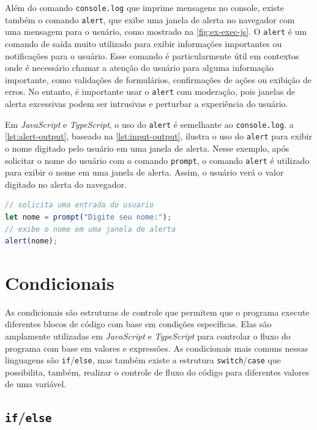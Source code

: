 Além do comando \texttt{console.log} que imprime mensagens no console, existe também o comando \texttt{alert}, que exibe uma janela de alerta no navegador com uma mensagem para o usuário, como mostrado na \autoref{fig:ex-exec-js}. O \texttt{alert} é um comando de saída muito utilizado para exibir informações importantes ou notificações para o usuário. Esse comando é particularmente útil em contextos onde é necessário chamar a atenção do usuário para alguma informação importante, como validações de formulários, confirmações de ações ou exibição de erros. No entanto, é importante usar o \texttt{alert} com moderação, pois janelas de alerta excessivas podem ser intrusivas e perturbar a experiência do usuário.

Em \textit{JavaScript} e \textit{TypeScript}, o uso do \texttt{alert} é semelhante ao \texttt{console.log}. a \autoref{lst:alert-output}, baseado na \autoref{lst:input-output}, ilustra o uso do \texttt{alert} para exibir o nome digitado pelo usuário em uma janela de alerta. Nesse exemplo, após solicitar o nome do usuário com o comando \texttt{prompt}, o comando \texttt{alert} é utilizado para exibir o nome em uma janela de alerta. Assim, o usuário verá o valor digitado no alerta do navegador.

\begin{lstlisting}[language=TypeScript, caption=Exemplo de Utilização do Comando Alert em JS e TS., label=lst:alert-output]
// solicita uma entrada do usuario
let nome = prompt("Digite seu nome:");
// exibe o nome em uma janela de alerta
alert(nome);
\end{lstlisting}


\section{Condicionais}
\label{JS_condicionais}

As condicionais são estruturas de controle que permitem que o programa execute diferentes blocos de código com base em condições específicas. Elas são amplamente utilizadas em \textit{JavaScript} e \textit{TypeScript} para controlar o fluxo do programa com base em valores e expressões. As condicionais mais comuns nessas linguagens são \texttt{if}/\texttt{else}, mas também existe a estrutura \texttt{switch}/\texttt{case} que possibilita, também, realizar o controle de fluxo do código para diferentes valores de uma variável.

\subsection{\texttt{if}/\texttt{else}}

